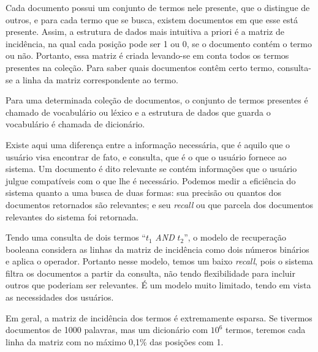 Cada documento possui um conjunto de termos nele presente, que o distingue de outros, e para cada termo que se busca, existem documentos em que esse está presente. Assim, a estrutura de dados mais intuitiva a priori é a matriz de incidência, na qual cada posição pode ser 1 ou 0, se o documento contém o termo ou não. Portanto, essa matriz é criada levando-se em conta todos os termos presentes na coleção. Para saber quais documentos contêm certo termo, consulta-se a linha da matriz correspondente ao termo.

Para uma determinada coleção de documentos, o conjunto de termos presentes é chamado de vocabulário ou léxico e a estrutura de dados que guarda o vocabulário é chamada de dicionário.

Existe aqui uma diferença entre a informação necessária, que é aquilo que o usuário visa encontrar de fato, e consulta, que é o que o usuário fornece ao sistema. Um documento é dito relevante se contém informações que o usuário julgue compatíveis com o que lhe é necessário. Podemos medir a eficiência do sistema quanto a uma busca de duas formas: sua precisão ou quantos dos documentos retornados são relevantes; e seu \emph{recall} ou que parcela dos documentos relevantes do sistema foi retornada.

Tendo uma consulta de dois termos ``$t_{1}$ \emph{AND} $t_{2}$'', o modelo de recuperação booleana considera as linhas da matriz de incidência como dois números binários e aplica o operador. Portanto nesse modelo, temos um baixo \emph{recall}, pois o sistema filtra os documentos a partir da consulta, não tendo flexibilidade para incluir outros que poderiam ser relevantes. É um modelo muito limitado, tendo em vista as necessidades dos usuários.

Em geral, a matriz de incidência dos termos é extremamente esparsa. Se tivermos documentos de 1000 palavras, mas um dicionário com $10^{6}$ termos, teremos cada linha da matriz com no máximo 0,1\% das posições com 1. 

